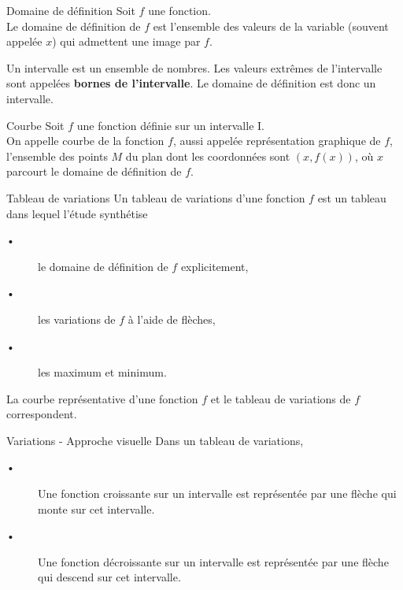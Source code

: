 \begin{synthesecours}

\end{synthesecours}


\begin{DefT}{Domaine de définition}
Soit $f$ une fonction. \\
Le domaine de définition de $f$ est l'ensemble des valeurs de la variable (souvent appelée $x$) qui admettent une image par $f$.
\end{DefT}


\begin{Rq}
Un intervalle est un ensemble de nombres. Les valeurs extrêmes de l'intervalle sont appelées \textbf{bornes de l'intervalle}. Le domaine de définition est donc un intervalle.
\end{Rq}


\begin{DefT}{Courbe}
Soit $f$ une fonction définie sur un intervalle I. \\
On appelle courbe de la fonction $f$, aussi appelée représentation graphique de $f$, l'ensemble des points $M$ du plan dont les coordonnées sont $(x,f(x))$, où $x$ parcourt le domaine de définition de $f$.
\end{DefT}

\begin{DefT}{Tableau de variations}
Un tableau de variations d'une fonction $f$ est un tableau dans lequel l'étude synthétise
\begin{description}
\item[•] le domaine de définition de $f$ explicitement,
\item[•] les variations de $f$ à l'aide de flèches,
\item[•] les maximum et minimum.
\end{description} 

\end{DefT}


\begin{Rq}
La courbe représentative d'une fonction $f$ et le tableau de variations de $f$ correspondent.
\end{Rq}


\begin{DefT}{Variations - Approche visuelle}
Dans un tableau de variations,
\begin{description}
\item[•] Une fonction croissante sur un intervalle est représentée par une flèche qui monte sur cet intervalle.
\item[•] Une fonction décroissante sur un intervalle est représentée par une flèche qui descend sur cet intervalle.
\end{description}
\end{DefT}



